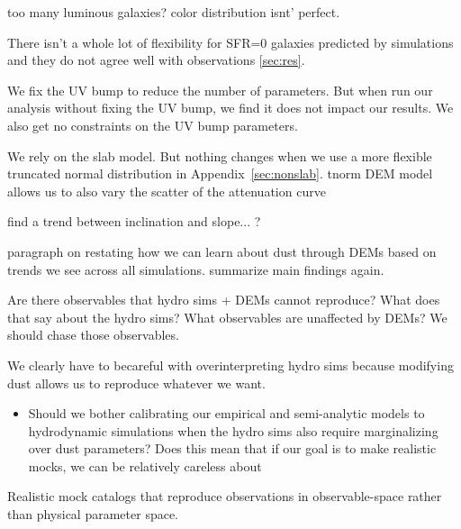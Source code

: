 too many luminous galaxies? 
color distribution isnt' perfect. 

There isn't a whole lot of flexibility for SFR=0 galaxies predicted by
simulations and they do not agree well with observations \ref{sec:res}. 

We fix the UV bump to reduce the number of parameters. But when run our
analysis without fixing the UV bump, we find it does not impact our results.
We also get no constraints on the UV bump parameters. 

We rely on the slab model. But nothing changes when we use a more flexible
truncated normal distribution in Appendix~\ref{sec:nonslab}. tnorm DEM model allows us to also vary the
scatter of the attenuation curve 

\cite{chevallard2013}
\cite{trayford2015}
\cite{battisti2017a} find a trend between inclination and slope...
\cite{naranyanan2018}? 





paragraph on restating how we can learn about dust through DEMs based on trends we see
across all simulations. summarize main findings again. 

Are there observables that hydro sims + DEMs cannot reproduce? What does that say about the hydro sims?
What observables are unaffected by DEMs? We should chase those observables. 

We clearly have to becareful with overinterpreting hydro sims because modifying
dust allows us to reproduce whatever we want. 
\begin{itemize}
    \item Should we bother calibrating our empirical and semi-analytic models
        to hydrodynamic simulations when the hydro sims also require
        marginalizing over dust parameters? Does this mean that if our goal is
        to make realistic mocks, we can be relatively careless about 
\end{itemize}

Realistic mock catalogs that reproduce observations in observable-space rather
than physical parameter space.   

